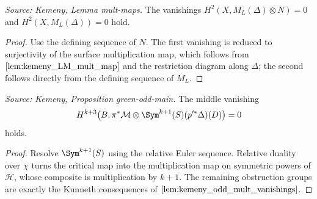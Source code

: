 \begin{lemma}
  \label{lem:kemeny_odd_mult_vanishings}
  \textit{Source: Kemeny, Lemma mult-maps.}
  The vanishings
  \(H^2(X,M_L(\Delta)\otimes N)=0\) and \(H^2(X,M_L(\Delta))=0\) hold.
\end{lemma}
\begin{proof}
  Use the defining sequence of \(N\).  The first vanishing is reduced to
  surjectivity of the surface multiplication map, which follows from
  \(\cref{lem:kemeny_LM_mult_map}\) and the restriction diagram along
  \(\Delta\); the second follows directly from the defining sequence of \(M_L\).
\end{proof}

\begin{proposition}[Odd \(i=k+1\) vanishing]
  \label{prop:kemeny_green_odd_main}
  \textit{Source: Kemeny, Proposition green-odd-main.}
  The middle vanishing
  \[
    H^{k+3}\bigl(B,\pi^*\mathcal M\otimes\Sym^{k+1}(S)(p'^*\Delta)(D)\bigr)=0
  \]
  holds.
\end{proposition}
\begin{proof}
  Resolve \(\Sym^{k+1}(S)\) using the relative Euler sequence.  Relative duality
  over \(\chi\) turns the critical map into the multiplication map on symmetric
  powers of \(\mathcal H\), whose composite is multiplication by \(k+1\).  The
  remaining obstruction groups are exactly the Kunneth consequences of
  \(\cref{lem:kemeny_odd_mult_vanishings}\).
\end{proof}

